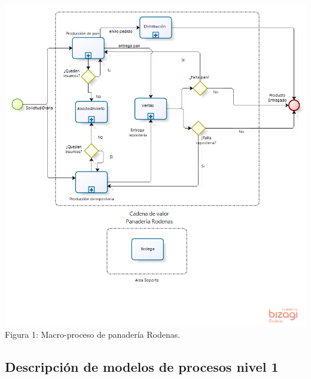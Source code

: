 \begin{center}
\includegraphics[width=15cm]{./imagenes/Macro_proceso.png}\\
Figura 1: Macro-proceso de panadería Rodenas.
\end{center}

\subsection{Descripción de modelos de procesos nivel 1} 

